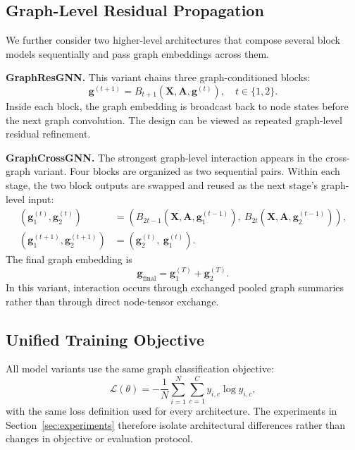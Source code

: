 \subsection{Graph-Level Residual Propagation}

We further consider two higher-level architectures that compose several block models sequentially and pass graph embeddings across them.

\textbf{GraphResGNN.} This variant chains three graph-conditioned blocks:
\begin{equation}
\mathbf{g}^{(t+1)} = B_{t+1}\!\left(\mathbf{X}, \mathbf{A}, \mathbf{g}^{(t)}\right), \quad t \in \{1,2\}.
\end{equation}
Inside each block, the graph embedding is broadcast back to node states before the next graph convolution. The design can be viewed as repeated graph-level residual refinement.

\textbf{GraphCrossGNN.} The strongest graph-level interaction appears in the cross-graph variant. Four blocks are organized as two sequential pairs. Within each stage, the two block outputs are swapped and reused as the next stage's graph-level input:
\begin{align}
(\mathbf{g}^{(t)}_{1}, \mathbf{g}^{(t)}_{2}) &= \left(B_{2t-1}\!\left(\mathbf{X}, \mathbf{A}, \mathbf{g}^{(t-1)}_{1}\right),\ B_{2t}\!\left(\mathbf{X}, \mathbf{A}, \mathbf{g}^{(t-1)}_{2}\right)\right), \\
(\mathbf{g}^{(t+1)}_{1}, \mathbf{g}^{(t+1)}_{2}) &= \left(\mathbf{g}^{(t)}_{2},\ \mathbf{g}^{(t)}_{1}\right).
\end{align}
The final graph embedding is
\begin{equation}
\mathbf{g}_{\mathrm{final}} = \mathbf{g}^{(T)}_{1} + \mathbf{g}^{(T)}_{2}.
\end{equation}
In this variant, interaction occurs through exchanged pooled graph summaries rather than through direct node-tensor exchange.

\subsection{Unified Training Objective}

All model variants use the same graph classification objective:
\begin{equation}
\mathcal{L}(\theta) = - \frac{1}{N} \sum_{i=1}^{N}\sum_{c=1}^{C} y_{i,c}\log \hat{y}_{i,c},
\end{equation}
with the same loss definition used for every architecture. The experiments in Section~\ref{sec:experiments} therefore isolate architectural differences rather than changes in objective or evaluation protocol.

